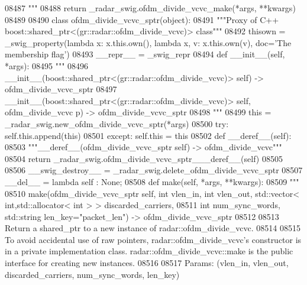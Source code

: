 \begin{DoxyCode}
{{{{{{{{{{{{{{{{{{{{{{{{{{{{08487 \textcolor{stringliteral}{    """}
08488   \textcolor{keywordflow}{return} \_radar\_swig.ofdm\_divide\_vcvc\_make(*args, **kwargs)
08489 
08490 \textcolor{keyword}{class }ofdm_divide_vcvc_sptr(object):
08491     \textcolor{stringliteral}{"""Proxy of C++ boost::shared\_ptr<(gr::radar::ofdm\_divide\_vcvc)> class"""}
08492     thisown = _swig_property(\textcolor{keyword}{lambda} x: x.this.own(), \textcolor{keyword}{lambda} x, v: x.this.own(v), doc=\textcolor{stringliteral}{'The membership flag'})
08493     \_\_repr\_\_ = \_swig\_repr
08494     \textcolor{keyword}{def }__init__(self, *args): 
08495         \textcolor{stringliteral}{"""}
08496 \textcolor{stringliteral}{        \_\_init\_\_(boost::shared\_ptr<(gr::radar::ofdm\_divide\_vcvc)> self) -> ofdm\_divide\_vcvc\_sptr}
08497 \textcolor{stringliteral}{        \_\_init\_\_(boost::shared\_ptr<(gr::radar::ofdm\_divide\_vcvc)> self, ofdm\_divide\_vcvc p) ->
       ofdm\_divide\_vcvc\_sptr}
08498 \textcolor{stringliteral}{        """}
08499         this = \_radar\_swig.new\_ofdm\_divide\_vcvc\_sptr(*args)
08500         \textcolor{keywordflow}{try}: self.this.append(this)
08501         \textcolor{keywordflow}{except}: self.this = this
08502     \textcolor{keyword}{def }__deref__(self):
08503         \textcolor{stringliteral}{"""\_\_deref\_\_(ofdm\_divide\_vcvc\_sptr self) -> ofdm\_divide\_vcvc"""}
08504         \textcolor{keywordflow}{return} \_radar\_swig.ofdm\_divide\_vcvc\_sptr\_\_\_deref\_\_(self)
08505 
08506     \_\_swig\_destroy\_\_ = \_radar\_swig.delete\_ofdm\_divide\_vcvc\_sptr
08507     \_\_del\_\_ = \textcolor{keyword}{lambda} self : \textcolor{keywordtype}{None};
08508     \textcolor{keyword}{def }make(self, *args, **kwargs):
08509         \textcolor{stringliteral}{"""}
08510 \textcolor{stringliteral}{        make(ofdm\_divide\_vcvc\_sptr self, int vlen\_in, int vlen\_out, std::vector< int,std::allocator< int >
       > discarded\_carriers, }
08511 \textcolor{stringliteral}{            int num\_sync\_words, std::string len\_key="packet\_len") -> ofdm\_divide\_vcvc\_sptr}
08512 \textcolor{stringliteral}{}
08513 \textcolor{stringliteral}{        Return a shared\_ptr to a new instance of radar::ofdm\_divide\_vcvc.}
08514 \textcolor{stringliteral}{}
08515 \textcolor{stringliteral}{        To avoid accidental use of raw pointers, radar::ofdm\_divide\_vcvc's constructor is in a private
       implementation class. radar::ofdm\_divide\_vcvc::make is the public interface for creating new instances.}
08516 \textcolor{stringliteral}{}
08517 \textcolor{stringliteral}{        Params: (vlen\_in, vlen\_out, discarded\_carriers, num\_sync\_words, len\_key)}
}}}}}}}}}}}}}}}}}}}}}}}}}}}}
\end{DoxyCode}

